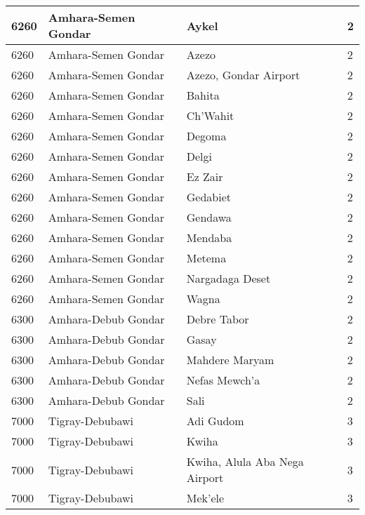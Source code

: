 \documentclass[12pt,a4paper,openbib,titlepage]{report}
\begin{document}
\begin{longtable}{|p{2cm}|p{6.5cm}|p{8cm}|p{1.5cm}|}
\hline 
\rule[-1ex]{0pt}{2.5ex} 6260 & Amhara-Semen Gondar & Aykel & 2 \\
\hline 
\rule[-1ex]{0pt}{2.5ex} 6260 & Amhara-Semen Gondar & Azezo & 2 \\
\hline 
\rule[-1ex]{0pt}{2.5ex} 6260 & Amhara-Semen Gondar & Azezo, Gondar Airport & 2 \\
\hline 
\rule[-1ex]{0pt}{2.5ex} 6260 & Amhara-Semen Gondar & Bahita & 2 \\
\hline 
\rule[-1ex]{0pt}{2.5ex} 6260 & Amhara-Semen Gondar & Ch'Wahit & 2 \\
\hline 
\rule[-1ex]{0pt}{2.5ex} 6260 & Amhara-Semen Gondar & Degoma & 2 \\
\hline 
\rule[-1ex]{0pt}{2.5ex} 6260 & Amhara-Semen Gondar & Delgi & 2 \\
\hline 
\rule[-1ex]{0pt}{2.5ex} 6260 & Amhara-Semen Gondar & Ez Zair & 2 \\
\hline 
\rule[-1ex]{0pt}{2.5ex} 6260 & Amhara-Semen Gondar & Gedabiet & 2 \\
\hline 
\rule[-1ex]{0pt}{2.5ex} 6260 & Amhara-Semen Gondar & Gendawa & 2 \\
\hline 
\rule[-1ex]{0pt}{2.5ex} 6260 & Amhara-Semen Gondar & Mendaba & 2 \\
\hline 
\rule[-1ex]{0pt}{2.5ex} 6260 & Amhara-Semen Gondar & Metema & 2 \\
\hline 
\rule[-1ex]{0pt}{2.5ex} 6260 & Amhara-Semen Gondar & Nargadaga Deset & 2 \\
\hline 
\rule[-1ex]{0pt}{2.5ex} 6260 & Amhara-Semen Gondar & Wagna & 2 \\
\hline 
\rule[-1ex]{0pt}{2.5ex} 6300 & Amhara-Debub Gondar & Debre Tabor & 2 \\
\hline 
\rule[-1ex]{0pt}{2.5ex} 6300 & Amhara-Debub Gondar & Gasay & 2 \\
\hline 
\rule[-1ex]{0pt}{2.5ex} 6300 & Amhara-Debub Gondar & Mahdere Maryam & 2 \\
\hline 
\rule[-1ex]{0pt}{2.5ex} 6300 & Amhara-Debub Gondar & Nefas Mewch'a & 2 \\
\hline 
\rule[-1ex]{0pt}{2.5ex} 6300 & Amhara-Debub Gondar & Sali & 2 \\
\hline 
\rule[-1ex]{0pt}{2.5ex} 7000 & Tigray-Debubawi & Adi Gudom & 3 \\
\hline 
\rule[-1ex]{0pt}{2.5ex} 7000 & Tigray-Debubawi & Kwiha & 3 \\
\hline 
\rule[-1ex]{0pt}{2.5ex} 7000 & Tigray-Debubawi & Kwiha, Alula Aba Nega Airport & 3 \\
\hline 
\rule[-1ex]{0pt}{2.5ex} 7000 & Tigray-Debubawi & Mek'ele & 3 \\

\end{longtable}
\end{document}
